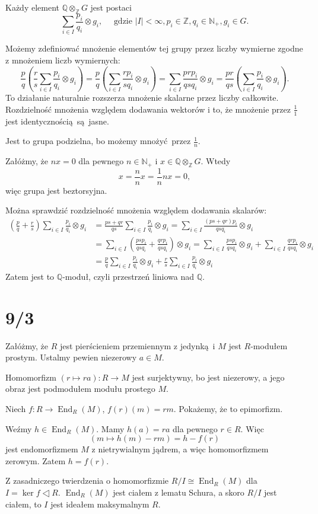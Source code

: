 \documentclass[a4paper, 12pt]{article}
\DeclareMathOperator{\End}{End}
\newcommand{\+}{\enspace}
\begin{document}
Każdy element $ℚ ⊗_ℤ G$ jest postaci
$$∑_{i∈I} \frac{p_i}{q_i} ⊗ g_i, \quad \text{ gdzie }|I|<∞, p_i∈ℤ, q_i ∈ ℕ_+, g_i ∈ G.$$

Możemy zdefiniować mnożenie elementów tej grupy przez
liczby wymierne zgodne z mnożeniem liczb wymiernych:
$$ \frac{p}{q} \left( \frac{r}{s} ∑_{i∈I} \frac{p_i}{q_i} ⊗ g_i \right)
=  \frac{p}{q} \left( ∑_{i∈I} \frac{r p_i}{s q_i} ⊗ g_i \right)
=  ∑_{i∈I} \frac{p r p_i}{q s q_i} ⊗ g_i
=  \frac{pr}{qs} \left( ∑_{i∈I} \frac{p_i}{q_i} ⊗ g_i \right). $$
To działanie naturalnie rozszerza mnożenie skalarne przez liczby całkowite.
Rozdzielność mnożenia względem dodawania wektorów i to, że mnożenie
przez $\frac{1}{1}$ jest identycznością są jasne.

Jest to grupa podzielna, bo możemy mnożyć przez $\frac{1}{n}$.

Załóżmy, że $nx = 0$ dla pewnego $n∈ℕ_+$ i $x∈ ℚ ⊗_ℤ G$.
Wtedy $$x = \frac{n}{n} x = \frac{1}{n} nx = 0,$$
więc grupa jest beztorsyjna.

Można sprawdzić rozdzielność mnożenia względem dodawania skalarów:
\begin{align*}
\left(\frac{p}{q} + \frac{r}{s} \right) ∑_{i∈I} \frac{p_i}{q_i} ⊗ g_i
&= \frac{ps+qr}{qs} ∑_{i∈I} \frac{p_i}{q_i} ⊗ g_i
= ∑_{i∈I} \frac{(ps+qr)p_i}{qs q_i} ⊗ g_i \\
&= ∑_{i∈I} \left( \frac{ps p_i}{qs q_i} + \frac{qr p_i}{qs q_i} \right) ⊗ g_i
= ∑_{i∈I} \frac{ps p_i}{qs q_i} ⊗ g_i + ∑_{i∈I} \frac{qr p_i}{qs q_i} ⊗ g_i \\
&= \frac{p}{q} ∑_{i∈I} \frac{p_i}{q_i} ⊗ g_i + \frac{r}{s} ∑_{i∈I} \frac{ p_i}{q_i} ⊗ g_i
\end{align*}
Zatem jest to $ℚ$-moduł, czyli przestrzeń liniowa nad $ℚ$.

\section*{9/3}
Załóżmy, że $R$ jest pierścieniem przemiennym z jedynką i
$M$ jest $R$-modułem prostym.
Ustalmy pewien niezerowy $a∈M$.

Homomorfizm $(r ↦ ra) : R → M$ jest surjektywny, bo
jest niezerowy, a jego obraz jest podmodułem modułu prostego $M$.

Niech $f: R → \End_R(M)$, $f(r)(m) = rm$.
Pokażemy, że to epimorfizm.

Weźmy $h ∈ \End_R(M)$.
Mamy $h(a) = ra$ dla pewnego $r∈R$.
Więc
$$(m ↦ h(m) - rm) = h - f(r)$$
jest endomorfizmem $M$
z nietrywialnym jądrem, a więc homomorfizmem zerowym.
Zatem $h=f(r)$.

Z zasadniczego twierdzenia o homomorfizmie
$R/I ≅ \End_R(M)$ dla $I=\ker f ◁ R$.
$\End_R(M)$ jest ciałem z lematu Schura,
a skoro $R/I$ jest ciałem, to $I$ jest ideałem
maksymalnym $R$.
\end{document}
